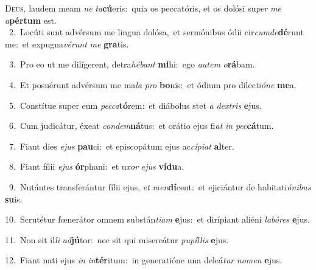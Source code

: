 \lettrine{\initial\textcolor{\initialcolor}{D}}{eus,} laudem meam \textit{ne} \textit{ta}\-\textbf{cú}eris:~\star quia os peccatóris, et os dolósi su\textit{per} \textit{me} \textit{a}\-\textbf{pér}\textbf{tum} est.\\
{\numbfont\textcolor{\numbcolor}{~2.}}~Locúti sunt advérsum me lingua dolósa,~\dagger et sermónibus ódii cir\-\textit{cum}\-\textit{de}\textbf{dé}runt me:~\star et expugna\-\textit{vé}\-\textit{runt} \textit{me} \textbf{gra}\-tis.\par
{\numbfont\textcolor{\numbcolor}{~3.}}~Pro eo ut me dilígerent, detra\-\textit{hé}\-\textit{bant} \textbf{mi}\-hi:~\star ego \textit{au}\-\textit{tem} \textit{o}\-\textbf{rá}bam.\par
{\numbfont\textcolor{\numbcolor}{~4.}}~Et posuérunt advérsum me ma\textit{la} \textit{pro} \textbf{bo}\-nis:~\star et ódium pro dilec\-\textit{ti}\-\textit{ó}\textit{ne} \textbf{me}\-a.\par
{\numbfont\textcolor{\numbcolor}{~5.}}~Constítue super eum \textit{pec}\-\textit{ca}\textbf{tó}rem:~\star et diábolus stet \textit{a} \textit{dex}\-\textit{tris} \textbf{e}\-jus.\par
{\numbfont\textcolor{\numbcolor}{~6.}}~Cum judicátur, éxeat \textit{con}\-\textit{dem}\textbf{ná}tus:~\star et orátio ejus fi\textit{at} \textit{in} \textit{pec}\-\textbf{cá}tum.\par
{\numbfont\textcolor{\numbcolor}{~7.}}~Fiant dies \textit{e}\-\textit{jus} \textbf{pau}\-ci:~\star et episcopátum ejus ac\-\textit{cí}\-\textit{pi}\textit{at} \textbf{al}\-ter.\par
{\numbfont\textcolor{\numbcolor}{~8.}}~Fiant fílii \textit{e}\-\textit{jus} \textbf{ór}\-phani:~\star et u\textit{xor} \textit{e}\-\textit{jus} \textbf{ví}\-\textbf{du}a.\par
{\numbfont\textcolor{\numbcolor}{~9.}}~Nutántes transferántur fílii ejus, \textit{et} \textit{men}\-\textbf{dí}cent:~\star et ejiciántur de habitati\-\textit{ó}\-\textit{ni}\textit{bus} \textbf{su}\-is.\par
{\numbfont\textcolor{\numbcolor}{10.}}~Scrutétur fœnerátor omnem substán\-\textit{ti}\-\textit{am} \textbf{e}\-jus:~\star et dirípiant aliéni \textit{la}\-\textit{bó}\textit{res} \textbf{e}\-jus.\par
{\numbfont\textcolor{\numbcolor}{11.}}~Non sit il\textit{li} \textit{ad}\-\textbf{jú}tor:~\star nec sit qui misereátur \textit{pu}\-\textit{píl}\textit{lis} \textbf{e}\-jus.\par
{\numbfont\textcolor{\numbcolor}{12.}}~Fiant nati ejus \textit{in} \textit{in}\-\textbf{tér}itum:~\star in generatióne una deleá\textit{tur} \textit{no}\-\textit{men} \textbf{e}\-jus.\par
